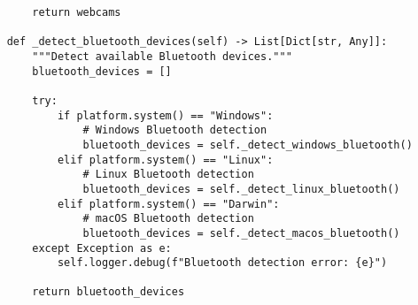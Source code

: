 \documentclass[11pt,a4paper]{article}
\begin{document}
\begin{verbatim}
        return webcams

    def _detect_bluetooth_devices(self) -> List[Dict[str, Any]]:
        """Detect available Bluetooth devices."""
        bluetooth_devices = []

        try:
            if platform.system() == "Windows":
                # Windows Bluetooth detection
                bluetooth_devices = self._detect_windows_bluetooth()
            elif platform.system() == "Linux":
                # Linux Bluetooth detection
                bluetooth_devices = self._detect_linux_bluetooth()
            elif platform.system() == "Darwin":
                # macOS Bluetooth detection
                bluetooth_devices = self._detect_macos_bluetooth()
        except Exception as e:
            self.logger.debug(f"Bluetooth detection error: {e}")

        return bluetooth_devices


\end{verbatim}
\end{document}
